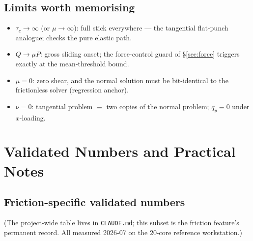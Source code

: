 \documentclass[11pt,a4paper]{article}
\newcommand{\code}[1]{\texttt{#1}}
\begin{document}
\subsection{Limits worth memorising}

\begin{itemize}
\item $\tau_c \to \infty$ (or $\mu \to \infty$): full stick everywhere ---
  the tangential flat-punch analogue; checks the pure elastic path.
\item $Q \to \mu P$: gross sliding onset; the force-control guard of
  \S\ref{sec:force} triggers exactly at the mean-threshold bound.
\item $\mu = 0$: zero shear, and the normal solution must be bit-identical
  to the frictionless solver (regression anchor).
\item $\nu = 0$: tangential problem $\equiv$ two copies of the normal
  problem; $q_y \equiv 0$ under $x$-loading.
\end{itemize}

\section{Validated Numbers and Practical Notes}
\label{sec:numbers}

\subsection{Friction-specific validated numbers}

(The project-wide table lives in \code{CLAUDE.md}; this subset is the
friction feature's permanent record. All measured 2026-07 on the 20-core
reference workstation.)
\end{document}
